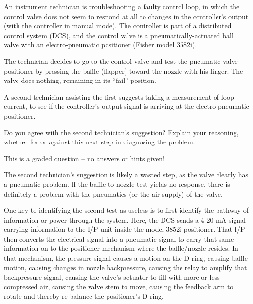 

An instrument technician is troubleshooting a faulty control loop, in which the control valve does not seem to respond at all to changes in the controller's output (with the controller in manual mode).  The controller is part of a distributed control system (DCS), and the control valve is a pneumatically-actuated ball valve with an electro-pneumatic positioner (Fisher model 3582i).

\vskip 10pt

The technician decides to go to the control valve and test the pneumatic valve positioner by pressing the baffle (flapper) toward the nozzle with his finger.  The valve does nothing, remaining in its ``fail'' position.

A second technician assisting the first suggests taking a measurement of loop current, to see if the controller's output signal is arriving at the electro-pneumatic positioner.

\vskip 10pt

Do you agree with the second technician's suggestion?  Explain your reasoning, whether for or against this next step in diagnosing the problem.

\vfil 

\eject






This is a graded question -- no answers or hints given!







The second technician's suggestion is likely a wasted step, as the valve clearly has a pneumatic problem.  If the baffle-to-nozzle test yields no response, there is definitely a problem with the pneumatics (or the air supply) of the valve.  

\vskip 10pt

One key to identifying the second test as useless is to first identify the pathway of information or power through the system.  Here, the DCS sends a 4-20 mA signal carrying information to the I/P unit inside the model 3852i positioner.  That I/P then converts the electrical signal into a pneumatic signal to carry that same information on to the positioner mechanism where the baffle/nozzle resides.  In that mechanism, the pressure signal causes a motion on the D-ring, causing baffle motion, causing changes in nozzle backpressure, causing the relay to amplify that backpressure signal, causing the valve's actuator to fill with more or less compressed air, causing the valve stem to move, causing the feedback arm to rotate and thereby re-balance the positioner's D-ring.

